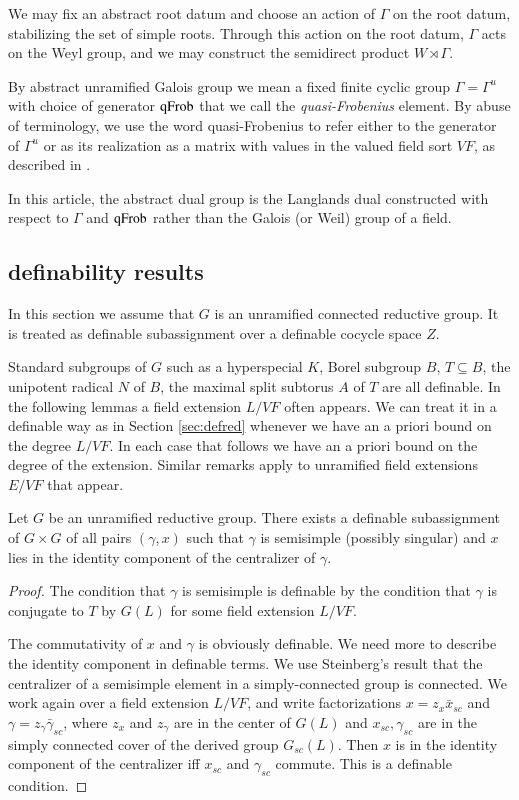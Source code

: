 We may fix an abstract root datum and choose an action of $\Gamma$ on
the root datum, stabilizing the set of simple roots.  Through this
action on the root datum, $\Gamma$ acts on the Weyl group, and we may
construct the semidirect product $W\rtimes \Gamma$.

By abstract unramified Galois group we mean a fixed finite cyclic
group $\Gamma=\Gamma^u$ with choice of generator ${\operatorname{qFrob}}$ that we
call the {\it quasi-Frobenius} element.  By abuse of terminology, we use
the word quasi-Frobenius to refer either to the generator of $\Gamma^u$
or as its realization as a matrix with values in the valued field sort $VF$,
as described in \cite{cluckers2011transfer}.

In this article, the abstract dual group is the Langlands dual
constructed with respect to $\Gamma$ and ${\operatorname{qFrob}}$ rather than the
Galois (or Weil) group of a field.

\subsection{definability results}\label{sec:definability}

In this section we assume that $G$ is an unramified connected
reductive group.  It is treated as definable subassignment over a
definable cocycle space $Z$.

Standard subgroups of $G$ such as a hyperspecial $K$, Borel subgroup
$B$, $T\subseteq B$, the unipotent radical $N$ of $B$, the maximal
split subtorus $A$ of $T$ are all definable.  In the following lemmas
a field extension $L/VF$ often appears.  We can treat it in a
definable way as in Section \ref{sec:defred} whenever we have an a
priori bound on the degree $L/VF$.  In each case that follows we have
an a priori bound on the degree of the extension.  Similar remarks
apply to unramified field extensions $E/VF$ that appear.

\begin{lemma}  
  Let $G$ be an unramified reductive group.  There exists a definable
  subassignment of $G\times G$ of all pairs $(\gamma,x)$ such that
  $\gamma$ is semisimple (possibly singular) and $x$ lies in the
  identity component of the centralizer of $\gamma$.
\end{lemma}

\begin{proof}  The condition that $\gamma$ is semisimple 
is definable by the condition that $\gamma$ is conjugate to $T$ by
$G(L)$ for some field extension $L/VF$. 

The commutativity of $x$ and $\gamma$ is obviously definable.  We need
more to describe the identity component in definable terms.  We use
Steinberg's result that the centralizer of a semisimple element in a
simply-connected group is connected.  We work again over a field
extension $L/VF$, and write factorizations $x = z_x \bar x_{sc}$ and
$\gamma = z_\gamma \bar \gamma_{sc}$, where $z_x$ and $z_\gamma$ are
in the center of $G(L)$ and $x_{sc},\gamma_{sc}$ are in the simply
connected cover of the derived group $G_{sc}(L)$.  Then $x$ is in the
identity component of the centralizer iff $x_{sc}$ and $\gamma_{sc}$
commute.  This is a definable condition.
\end{proof}

